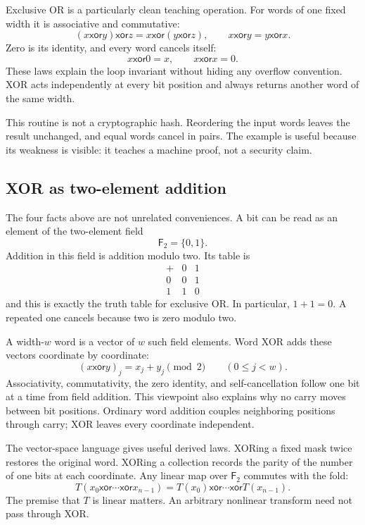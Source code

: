 Exclusive OR is a particularly clean teaching operation. For words of one
fixed width it is associative and commutative:
\[
 (x\mathbin{\mathsf{xor}}y)\mathbin{\mathsf{xor}}z
 =x\mathbin{\mathsf{xor}}(y\mathbin{\mathsf{xor}}z),
 \qquad
 x\mathbin{\mathsf{xor}}y=y\mathbin{\mathsf{xor}}x.
\]
Zero is its identity, and every word cancels itself:
\[
 x\mathbin{\mathsf{xor}}0=x,
 \qquad x\mathbin{\mathsf{xor}}x=0.
\]
These laws explain the loop invariant without hiding any overflow convention.
XOR acts independently at every bit position and always returns another word
of the same width.

This routine is not a cryptographic hash. Reordering the input words leaves
the result unchanged, and equal words cancel in pairs. The example is useful
because its weakness is visible: it teaches a machine proof, not a security
claim.

\subsection{XOR as two-element addition}

The four facts above are not unrelated conveniences. A bit can be read as an
element of the two-element field
\[
  \mathsf{F}_2=\{0,1\}.
\]
Addition in this field is addition modulo two. Its table is
\[
\begin{array}{c|cc}
+ & 0 & 1 \\
\hline
0 & 0 & 1 \\
1 & 1 & 0
\end{array}
\]
and this is exactly the truth table for exclusive OR. In particular,
\(1+1=0\). A repeated one cancels because two is zero modulo two.

A width-\(w\) word is a vector of \(w\) such field elements. Word XOR adds
these vectors coordinate by coordinate:
\[
 (x\mathbin{\mathsf{xor}}y)_j=x_j+y_j\pmod 2
 \qquad (0\le j<w).
\]
Associativity, commutativity, the zero identity, and self-cancellation follow
one bit at a time from field addition. This viewpoint also explains why no
carry moves between bit positions. Ordinary word addition couples neighboring
positions through carry; XOR leaves every coordinate independent.

The vector-space language gives useful derived laws. XORing a fixed mask
twice restores the original word. XORing a collection records the parity of
the number of one bits at each coordinate. Any linear map over
\(\mathsf{F}_2\) commutes with the fold:
\[
 T(x_0\mathbin{\mathsf{xor}}\cdots\mathbin{\mathsf{xor}}x_{n-1})
 =T(x_0)\mathbin{\mathsf{xor}}\cdots\mathbin{\mathsf{xor}}T(x_{n-1}).
\]
The premise that \(T\) is linear matters. An arbitrary nonlinear transform
need not pass through XOR.

